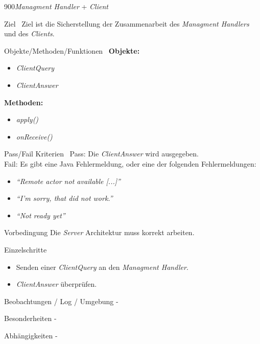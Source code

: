 \begin{testcase}{900}{\textit{Managment Handler} + \textit{Client}}

\item[Ziel]\
Ziel ist die Sicherstellung der Zusammenarbeit des \textit{Managment Handlers}
und des \textit{Clients}.
\item[Objekte/Methoden/Funktionen]\
\textbf{Objekte: }
\begin{itemize}
\item \textit{ClientQuery}
\item \textit{ClientAnswer}
\end{itemize}

\textbf{Methoden: }
\begin{itemize}
\item \textit{apply()}
\item \textit{onReceive()}
\end{itemize}
\item[Pass/Fail Kriterien]\
Pass: Die \textit{ClientAnswer} wird ausgegeben.\\
Fail: Es gibt eine Java Fehlermeldung, oder eine der folgenden Fehlermeldungen:
\begin{itemize}
\item \textit{``Remote actor not available [...]''}
\item \textit{``I'm sorry, that did not work.''}
\item \textit{``Not ready yet''}
\end{itemize}
\item[Vorbedingung]
Die \textit{Server} Architektur muss korrekt arbeiten.
\item[Einzelschritte]
\begin{itemize}
\item Senden einer \textit{ClientQuery} an den \textit{Managment Handler}.
\item \textit{ClientAnswer} überprüfen.
\end{itemize} 
\item[Beobachtungen / Log / Umgebung] -
\item[Besonderheiten] -
\item[Abhängigkeiten] -

\end{testcase}